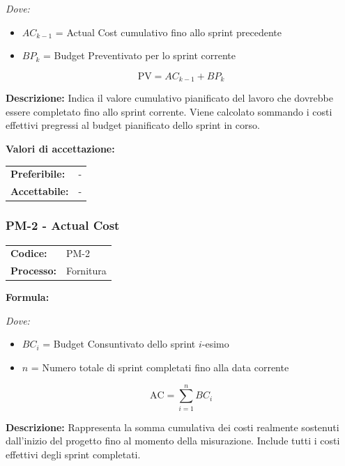 \documentclass[a4paper,11pt,oneside]{scrartcl}
\begin{document}
\noindent\textit{Dove:}
\begin{itemize}[leftmargin=1.5cm, topsep=0pt, itemsep=0pt]
    \item $AC_{k-1}$ = Actual Cost cumulativo fino allo sprint{\scriptsize{}} precedente
    \item $BP_k$ = Budget Preventivato per lo sprint corrente
\end{itemize}

\[
\text{PV} = AC_{k-1} + BP_k
\]

\noindent\textbf{Descrizione:} Indica il valore cumulativo pianificato del lavoro che dovrebbe essere completato fino allo sprint corrente. Viene calcolato sommando i costi effettivi pregressi al budget pianificato dello sprint in corso.

\vspace{0.2cm}
\noindent\textbf{Valori di accettazione:}
\vspace{0.1cm}

\noindent
\begin{tabular}{@{}ll@{}}
\textbf{Preferibile:} & - \\
\textbf{Accettabile:} & - \\
\end{tabular}

\subsubsection{PM-2 - Actual Cost}

\noindent
\begin{tabular}{@{}p{}p{}@{}}
\textbf{Codice:} & PM-2 \\
\textbf{Processo:} & Fornitura \\
\end{tabular}

\vspace{0.3cm}
\noindent\textbf{Formula:}

\noindent\textit{Dove:}
\begin{itemize}[leftmargin=1.5cm, topsep=0pt, itemsep=0pt]
    \item $BC_i$ = Budget Consuntivato dello sprint $i$-esimo
    \item $n$ = Numero totale di sprint completati fino alla data corrente
\end{itemize}

\[
\text{AC} = \sum_{i=1}^{n} BC_i
\]

\noindent\textbf{Descrizione:} Rappresenta la somma cumulativa dei costi realmente sostenuti dall'inizio del progetto fino al momento della misurazione. Include tutti i costi effettivi degli sprint completati.
\end{document}
